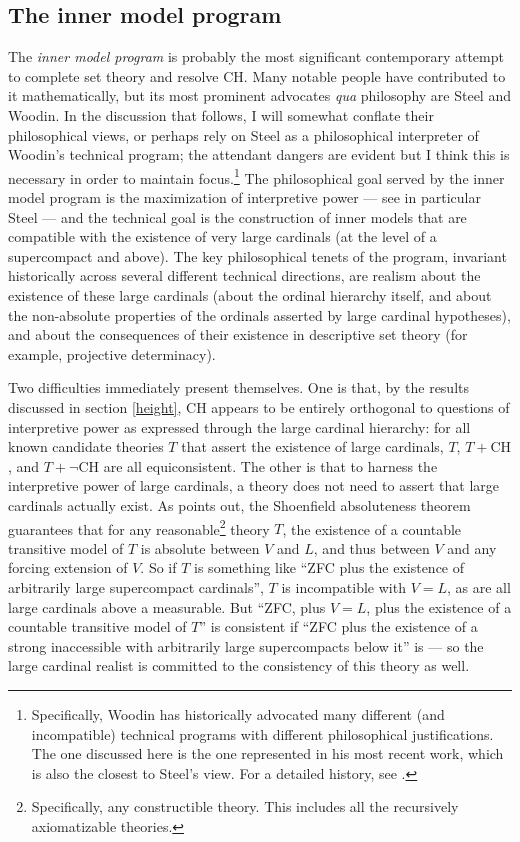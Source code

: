 \documentclass[letterpaper,12pt]{article}
\begin{document}
\subsection{The inner model program}
The \emph{inner model program} is probably the most significant contemporary attempt to complete set theory and resolve CH. Many notable people have contributed to it mathematically, but its most prominent advocates \emph{qua} philosophy are Steel and Woodin. In the discussion that follows, I will somewhat conflate their philosophical views, or perhaps rely on Steel as a philosophical interpreter of Woodin's technical program; the attendant dangers are evident but I think this is necessary in order to maintain focus.\footnote{Specifically, Woodin has historically advocated many different (and incompatible) technical programs with different philosophical justifications. The one discussed here is the one represented in his most recent work, which is also the closest to Steel's view. For a detailed history, see \cite{sep-continuum-hypothesis}.} The philosophical goal served by the inner model program is the maximization of interpretive power --- see in particular Steel \citeyearpar{feferman2000does,steel2012godel} --- and the technical goal is the construction of inner models that are compatible with the existence of very large cardinals (at the level of a supercompact and above). The key philosophical tenets of the program, invariant historically across several different technical directions, are realism about the existence of these large cardinals (about the ordinal hierarchy itself, and about the non-absolute properties of the ordinals asserted by large cardinal hypotheses), and about the consequences of their existence in descriptive set theory (for example, projective determinacy).

Two difficulties immediately present themselves. One is that, by the results discussed in section \ref{height}, CH appears to be entirely orthogonal to questions of interpretive power as expressed through the large cardinal hierarchy: for all known candidate theories $T$ that assert the existence of large cardinals, $T$, $T + \mathrm{CH}$, and $T + \neg \mathrm{CH}$ are all equiconsistent. The other is that to harness the interpretive power of large cardinals, a theory does not need to assert that large cardinals actually exist. As \cite{hamkins2012set} points out, the Shoenfield absoluteness theorem guarantees that for any reasonable\footnote{Specifically, any constructible theory. This includes all the recursively axiomatizable theories.} theory $T$, the existence of a countable transitive model of $T$ is absolute between $V$ and $L$, and thus between $V$ and any forcing extension of $V$. So if $T$ is something like ``ZFC plus the existence of arbitrarily large supercompact cardinals'', $T$ is incompatible with $V = L$, as are all large cardinals above a measurable. But ``ZFC, plus $V = L$, plus the existence of a countable transitive model of $T$'' is consistent if ``ZFC plus the existence of a strong inaccessible with arbitrarily large supercompacts below it'' is --- so the large cardinal realist is committed to the consistency of this theory as well.
\end{document}
